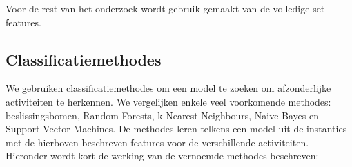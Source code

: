 \documentclass{article}
\begin{document}
Voor de rest van het onderzoek wordt gebruik gemaakt van de volledige set features.



\subsection{Classificatiemethodes}

We gebruiken classificatiemethodes om een model te zoeken om afzonderlijke activiteiten te herkennen. We vergelijken enkele veel voorkomende methodes: beslissingsbomen, Random Forests, k-Nearest Neighbours, Naive Bayes en Support Vector Machines. De methodes leren telkens een model uit de instanties met de hierboven beschreven features voor de verschillende activiteiten. Hieronder wordt kort de werking van de vernoemde methodes beschreven:
\end{document}
